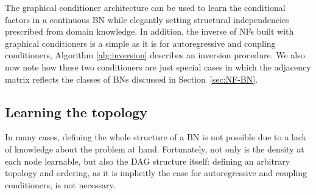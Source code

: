 \documentclass[twoside]{article}
\newcommand{\mathbf}{\boldsymbol}
\newcommand{\gilles}[1]{\textcolor{red}{[GL: #1]}}
\newcommand{\antoine}[1]{\textcolor{orange}{[AW: #1]}}
\begin{document}
The graphical conditioner architecture can be used to learn the conditional factors in a continuous BN while elegantly setting structural independencies prescribed from domain knowledge. In addition, the inverse of NFs built with graphical conditioners is a simple as it is for autoregressive and coupling conditioners, Algorithm \ref{alg:inversion} describes an inversion procedure.
We also now note how these two conditioners are just special cases in which the adjacency matrix reflects the classes of BNs discussed in Section~\ref{sec:NF-BN}.

\subsection{Learning the topology}\label{sec:learn_topo}
In many cases, defining the whole structure of a BN is not possible due to a lack of knowledge about the problem at hand.
Fortunately, not only is the density at each node learnable, but also the DAG structure itself:
defining an arbitrary topology and ordering, as it is implicitly the case for autoregressive and coupling conditioners, is not necessary.
\end{document}
